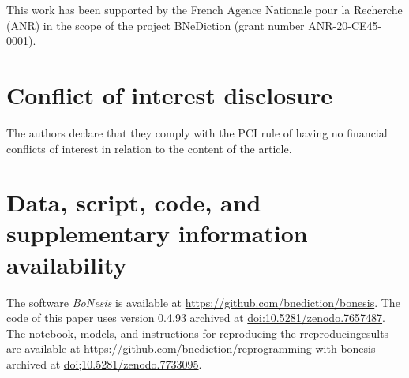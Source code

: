 \documentclass[PCJ,Unicode,screen,mode=plain]{cedram}
\begin{document}
This work has been supported by the French Agence Nationale pour la
Recherche (ANR) in the scope of the project
BNeDiction (grant number ANR-20-CE45-0001).

\section*{Conflict of interest disclosure}

The authors declare that they comply with the PCI rule of having no financial
conflicts of interest in relation to the content of the article.

\section*{Data, script, code, and supplementary information availability}

The software \emph{BoNesis} is available at \url{https://github.com/bnediction/bonesis}. The code of this
paper uses version 0.4.93 archived at \href{https://doi.org/10.5281/zenodo.7657487}{doi:10.5281/zenodo.7657487}.
The notebook, models, and instructions for reproducing the rreproducingesults are available at
\url{https://github.com/bnediction/reprogramming-with-bonesis} archived at
\href{https://doi.org/10.5281/zenodo.7733095}{doi;10.5281/zenodo.7733095}.

\printbibliography
\end{document}
